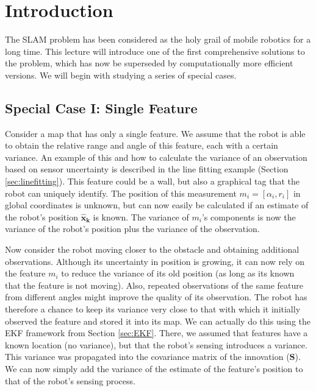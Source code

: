 \documentclass[paper=6.14in:9.21in,pagesize=pdftex,11pt,twoside,openright]{scrbook}
\begin{document}
\section{Introduction}
The SLAM problem has been considered as the holy grail of mobile robotics for a long time. This lecture will introduce one of the first comprehensive solutions to the problem, which has now be superseded by computationally more efficient versions. We will begin with studying a series of special cases.

\subsection{Special Case I: Single Feature}
Consider a map that has only a single feature. We assume that the robot is able to obtain the relative range and angle of this feature, each with a certain variance. An example of this and how to calculate the variance of an observation based on sensor uncertainty is described in the line fitting example (Section \ref{sec:linefitting}). This feature could be a wall, but also a graphical tag that the robot can uniquely identify. The position of this measurement $m_i=[\alpha_i,r_i]$  in global coordinates is unknown, but can now easily be calculated if an estimate of the robot's position $\boldsymbol{\hat{x}_k}$ is known.  The variance of $ m_i$'s components is now the variance of the robot's position plus the variance of the observation.

Now consider the robot moving closer to the obstacle and obtaining additional observations. Although its uncertainty in position is growing, it can now rely on the feature $m_i$ to reduce the variance of its old position (as long as its known that the feature is not moving). Also, repeated observations of the same feature from different angles might improve the quality of its observation. The robot has therefore a chance to keep its variance very close to that with which it initially observed the feature and stored it into its map. We can actually do this using the EKF framework from Section \ref{sec:EKF}. There, we assumed that features have a known location (no variance), but that the robot's sensing introduces a variance. This variance was propagated into the covariance matrix of the innovation ($ \boldsymbol{S}$). We can now simply add the variance of the estimate of the feature's position to that of the robot's sensing process.
\end{document}
